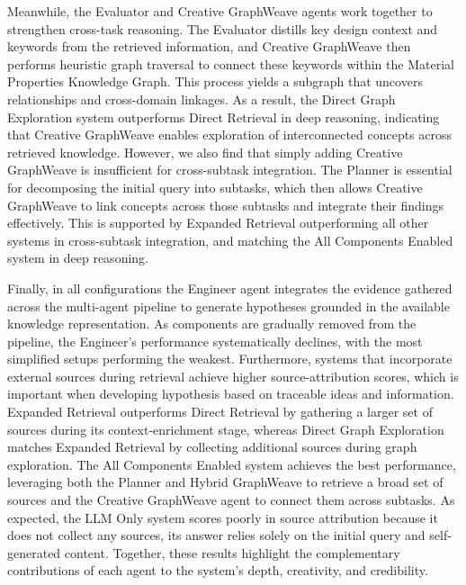 Meanwhile, the Evaluator and Creative GraphWeave agents work together to strengthen cross-task reasoning. The Evaluator distills key design context and keywords from the retrieved information, and Creative GraphWeave then performs heuristic graph traversal to connect these keywords within the Material Properties Knowledge Graph. This process yields a subgraph that uncovers relationships and cross-domain linkages. As a result, the Direct Graph Exploration system outperforms Direct Retrieval in deep reasoning, indicating that Creative GraphWeave enables exploration of interconnected concepts across retrieved knowledge. However, we also find that simply adding Creative GraphWeave is insufficient for cross-subtask integration. The Planner is essential for decomposing the initial query into subtasks, which then allows Creative GraphWeave to link concepts across those subtasks and integrate their findings effectively. This is supported by Expanded Retrieval outperforming all other systems in cross-subtask integration, and matching the All Components Enabled system in deep reasoning.

Finally, in all configurations the Engineer agent integrates the evidence gathered across the multi-agent pipeline to generate hypotheses grounded in the available knowledge representation. As components are gradually removed from the pipeline, the Engineer’s performance systematically declines, with the most simplified setups performing the weakest. Furthermore, systems that incorporate external sources during retrieval achieve higher source-attribution scores, which is important when developing hypothesis based on traceable ideas and information. Expanded Retrieval outperforms Direct Retrieval by gathering a larger set of sources during its context-enrichment stage, whereas Direct Graph Exploration matches Expanded Retrieval by collecting additional sources during graph exploration. The All Components Enabled system achieves the best performance, leveraging both the Planner and Hybrid GraphWeave to retrieve a broad set of sources and the Creative GraphWeave agent to connect them across subtasks. As expected, the LLM Only system scores poorly in source attribution because it does not collect any sources, its answer relies solely on the initial query and self-generated content. Together, these results highlight the complementary contributions of each agent to the system’s depth, creativity, and credibility.

